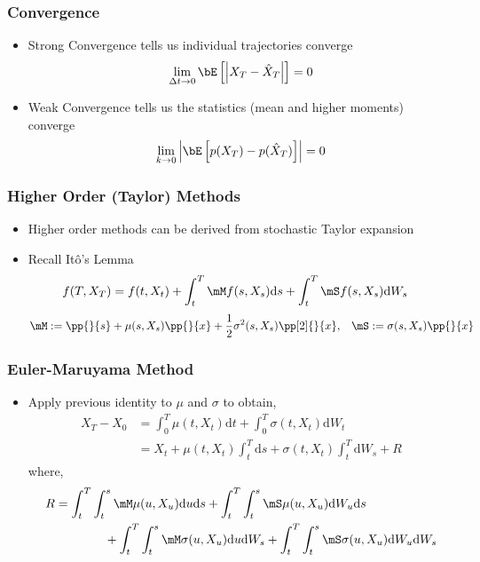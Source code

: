 \documentclass{beamer}
\renewcommand{\d}{\ensuremath{\mathrm{d}}}
\begin{document}
\begin{frame}
\frametitle{Convergence}
\begin{itemize}
\item Strong Convergence tells us individual trajectories converge
\begin{align*}
    \lim_{\Delta t\to 0}\bE\left[\left| X_T - \hat{X}_T \right|\right] = 0
\end{align*}

\item Weak Convergence tells us the statistics (mean and higher moments) converge
\begin{align*}
    \lim_{k\to 0} \left| \bE\left[ p(X_T) - p(\hat{X}_T) \right] \right| = 0
\end{align*}
\end{itemize}
\end{frame}

\begin{frame}
\frametitle{Higher Order (Taylor) Methods}
\begin{itemize}
\item Higher order methods can be derived from stochastic Taylor expansion
\item Recall It\^o's Lemma
{\footnotesize
\begin{align*}
    f(T,X_T) &= f(t,X_t) + \int_t^T \mM f(s,X_s)\d s + \int_t^T \mS f(s,X_s) \d W_s \label{ito1}
\end{align*}}
{\footnotesize
\begin{align*}
    \mM := \pp{}{s} +  \mu(s,X_s)\pp{}{x} + \frac{1}{2}\sigma^2(s,X_s) \pp[2]{}{x}, && \mS := \sigma(s,X_s) \pp{}{x}
\end{align*}}
\end{itemize}
\end{frame}

\begin{frame}
\frametitle{Euler-Maruyama Method}
\begin{itemize}
\item Apply previous identity to \( \mu \) and \( \sigma \) to obtain,
{\scriptsize
\begin{align*}
    X_{T} - X_{0} &= \int_{0}^{T} \mu(t,X_t)\d t + \int_{0}^{T} \sigma(t,X_t) \d W_t \\
    &= X_t + \mu(t,X_t) \int_t^T \d s +  \sigma(t,X_t)\int_t^T \d W_s + R
\end{align*}}
where,
{\scriptsize
\begin{align}
    R &=  \int_t^T \int_t^s \mM \mu(u,X_u) \d u \d s + \int_t^T \int_t^s \mS \mu(u,X_u)\d W_u  \d s \tag*{}
    \\ &\hspace{4em} + \int_t^T \int_t^s \mM \sigma(u,X_u)\d u \d W_s + \int_t^T \int_t^s \mS \sigma(u,X_u) \d W_u \d W_s
\end{align}}
\end{itemize}
\end{frame}
\end{document}
